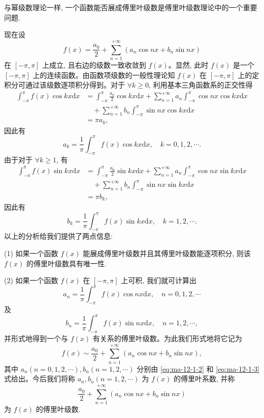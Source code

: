 与幂级数理论一样, 一个函数能否展成傅里叶级数是傅里叶级数理论中的一个重要问题.

现在设
\[
  f(x)=\frac{a_0}{2}+\sum_{n=1}^{+\infty}(a_n\cos nx+b_n\sin nx)
\]
在 $[-\pi,\pi]$ 上成立, 且右边的级数一致收敛到 $f(x)$。显然, 此时 $f(x)$ 是一个 $[-\pi,\pi]$ 上的连续函数。由函数项级数的一般性理论知 $f(x)$ 在 $[-\pi,\pi]$ 上的定积分可通过该级数逐项积分得到。对于 $\forall k\geqslant0$, 利用基本三角函数系的正交性得
\[
\begin{aligned}
  \int_{-\pi}^{\pi}f(x)\cos kx\mathrm dx
  &=\int_{-\pi}^{\pi}\frac{a_0}{2}\cos kx\mathrm dx
    +\sum_{n=1}^{+\infty}a_n\int_{-\pi}^{\pi}\cos nx\cos kx\mathrm dx \\
  &\quad+\sum_{n=1}^{+\infty}b_n\int_{-\pi}^{\pi}\sin nx\cos kx\mathrm dx \\
  &=\pi a_k,
\end{aligned}
\]
因此有
\[
  a_k=\frac1\pi\int_{-\pi}^{\pi}f(x)\cos kx\mathrm dx,\quad k=0,1,2,\cdots.
\]
由于对于 $\forall k\geqslant1$, 有
\[
\begin{aligned}
  \int_{-\pi}^{\pi}f(x)\sin kx\mathrm dx
  &=\int_{-\pi}^{\pi}\frac{a_0}{2}\sin kx\mathrm dx
    +\sum_{n=1}^{+\infty}a_n\int_{-\pi}^{\pi}\cos nx\sin kx\mathrm dx \\
  &\quad+\sum_{n=1}^{+\infty}b_n\int_{-\pi}^{\pi}\sin nx\sin kx\mathrm dx \\
  &=\pi b_k,
\end{aligned}
\]
因此有
\[
  b_k=\frac1\pi\int_{-\pi}^{\pi}f(x)\sin kx\mathrm dx,\quad k=1,2,\cdots.
\]
以上的分析给我们提供了两点信息:

(1) 如果一个函数 $f(x)$ 能展成傅里叶级数并且其傅里叶级数能逐项积分, 则该 $f(x)$ 的傅里叶级数具有唯一性.

(2) 如果一个函数 $f(x)$ 在 $[-\pi,\pi]$ 上可积, 我们就可计算出
\begin{equation}
  a_n=\frac1\pi\int_{-\pi}^{\pi}f(x)\cos nx\mathrm dx,\quad n=0,1,2,\cdots
  \label{eq:ma-12-1-2}
\end{equation}
及
\begin{equation}
  b_n=\frac1\pi\int_{-\pi}^{\pi}f(x)\sin nx\mathrm dx,\quad n=1,2,\cdots,
  \label{eq:ma-12-1-3}
\end{equation}
并形式地得到一个与 $f(x)$ 有关系的傅里叶级数。为此我们形式地将它记为
\begin{equation}
  f(x)\sim\frac{a_0}{2}+\sum_{n=1}^{+\infty}(a_n\cos nx+b_n\sin nx),
  \label{eq:ma-12-1-4}
\end{equation}
其中 $a_n(n=0,1,2,\cdots), b_n(n=1,2,\cdots)$ 分别由 \eqref{eq:ma-12-1-2} 和 \eqref{eq:ma-12-1-3} 式给出。今后我们将称 $a_n,b_n(n=1,2,\cdots)$ 为 $f(x)$ 的傅里叶系数, 并称
\[
  \frac{a_0}{2}+\sum_{n=1}^{+\infty}(a_n\cos nx+b_n\sin nx)
\]
为 $f(x)$ 的傅里叶级数.

